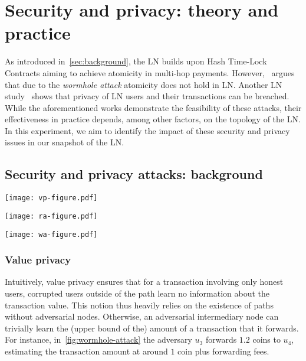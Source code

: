 \section{Security and privacy: theory and practice}
\label{sec:sec-priv-attacks}

As introduced in~\cref{sec:background}, the LN builds upon Hash Time-Lock Contracts aiming to achieve 
atomicity in multi-hop payments.
However,~\cite{Malavolta2019} argues that due to the \emph{wormhole attack} atomicity does not hold in LN.
Another LN study~\cite{Malavolta2017} shows that privacy of LN users and their transactions can be breached.
While the aforementioned works demonstrate the feasibility of these attacks, 
their effectiveness in practice depends, among other factors, on the topology of the LN.
In this experiment, we aim to identify the impact of these security and privacy issues in our snapshot of the LN.

\subsection{Security and privacy attacks: background}

\begin{figure*}[tb]
	\texttt{[image: vp-figure.pdf]}
	
	\vspace{0.3cm}
	
	\texttt{[image: ra-figure.pdf]}
	
	\vspace{0.3cm}
	
	\texttt{[image: wa-figure.pdf]}
	
	\caption{\label{fig:wormhole-attack} An illustrative example of value privacy (top), relationship anonymity (middle), and the wormhole attack (bottom).}
\end{figure*}

\subsubsection{Value privacy~\cite{Malavolta2017}}
Intuitively, value privacy ensures that for a transaction involving only honest users, 
corrupted users outside of the path learn no information about the transaction value.
This notion thus heavily relies on the existence of paths without adversarial nodes.  
Otherwise, an adversarial intermediary node can trivially learn the (upper bound of the) amount of a transaction that it forwards. 
For instance, in~\cref{fig:wormhole-attack} the adversary $u_3$
forwards $1.2$ coins to $u_4$, estimating the transaction amount at around $1$ coin plus forwarding fees.

